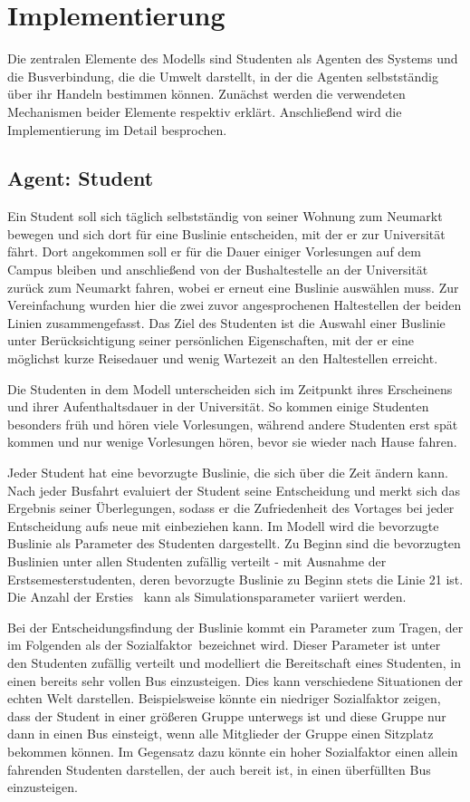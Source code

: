 \documentclass[12pt,a4paper]{scrartcl}
\begin{document}
\section{Implementierung}\label{impl}
Die zentralen Elemente des Modells sind Studenten als Agenten des Systems und die Busverbindung, die die Umwelt darstellt, in der die Agenten selbstständig über ihr Handeln bestimmen können. Zunächst werden die verwendeten Mechanismen beider Elemente respektiv erklärt. Anschließend wird die Implementierung im Detail besprochen.

\subsection{Agent: Student}\label{agent}
Ein Student soll sich täglich selbstständig von seiner Wohnung zum Neumarkt bewegen und sich dort für eine Buslinie entscheiden, mit der er zur Universität fährt. Dort angekommen soll er für die Dauer einiger Vorlesungen auf dem Campus bleiben und anschließend von der Bushaltestelle an der Universität zurück zum Neumarkt fahren, wobei er erneut eine Buslinie auswählen muss. Zur Vereinfachung wurden hier die zwei zuvor angesprochenen Haltestellen der beiden Linien zusammengefasst. 
Das Ziel des Studenten ist die Auswahl einer Buslinie unter Berücksichtigung seiner persönlichen Eigenschaften, mit der er eine möglichst kurze Reisedauer und wenig Wartezeit an den Haltestellen erreicht.

Die Studenten in dem Modell unterscheiden sich im Zeitpunkt ihres Erscheinens und ihrer Aufenthaltsdauer in der Universität. So kommen einige Studenten besonders früh und hören viele Vorlesungen, während andere Studenten erst spät kommen und nur wenige Vorlesungen hören, bevor sie wieder nach Hause fahren.

Jeder Student hat eine bevorzugte Buslinie, die sich über die Zeit ändern kann. Nach jeder Busfahrt evaluiert der Student seine Entscheidung und merkt sich das Ergebnis seiner Überlegungen, sodass er die Zufriedenheit des Vortages bei jeder Entscheidung aufs neue mit einbeziehen kann. Im Modell wird die bevorzugte Buslinie als Parameter des Studenten dargestellt. Zu Beginn sind die bevorzugten Buslinien unter allen Studenten zufällig verteilt - mit Ausnahme der Erstsemesterstudenten, deren bevorzugte Buslinie zu Beginn stets die Linie 21 ist. Die Anzahl der \glqq Ersties\grqq~ kann als Simulationsparameter variiert werden.

Bei der Entscheidungsfindung der Buslinie kommt ein Parameter zum Tragen, der im Folgenden als der \glqq Sozialfaktor\grqq~bezeichnet wird. Dieser Parameter ist unter den Studenten zufällig verteilt und modelliert die Bereitschaft eines Studenten, in einen bereits sehr vollen Bus einzusteigen. Dies kann verschiedene Situationen der echten Welt darstellen. Beispielsweise könnte ein niedriger Sozialfaktor zeigen, dass der Student in einer größeren Gruppe unterwegs ist und diese Gruppe nur dann in einen Bus einsteigt, wenn alle Mitglieder der Gruppe einen Sitzplatz bekommen können. Im Gegensatz dazu könnte ein hoher Sozialfaktor  einen allein fahrenden Studenten darstellen, der auch bereit ist, in einen überfüllten Bus einzusteigen.
\end{document}
